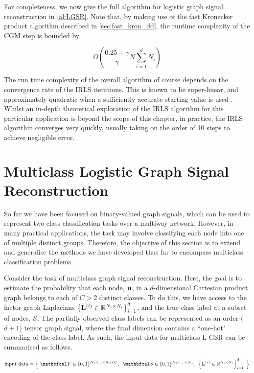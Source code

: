 For completeness, we now give the full algorithm for logistic graph signal reconstruction in \cref{al:LGSR}. Note that, by making use of the fast Kronecker product algorithm described in \cref{sec:fast_kron_dd}, the runtime complexity of the CGM step is bounded by 

\begin{equation*}
    O\left(\frac{0.25 + \gamma}{\gamma} N \sum_{i=1}^d N_i \right)
\end{equation*}

The run time complexity of the overall algorithm of course depends on the convergence rate of the IRLS iterations. This is known to be super-linear, and approximately quadratic when a sufficiently accurate starting value is used \citep{Burden2010}. Whilst an in-depth theoretical exploration of the IRLS algorithm for this particular application is beyond the scope of this chapter, in practice, the IRLS algorithm converges very quickly, usually taking on the order of 10 steps to achieve negligible error.

\section{Multiclass Logistic Graph Signal Reconstruction}

\label{sec:multiclass}

So far we have been focused on binary-valued graph signals, which can be used to represent two-class classification tasks over a multiway network. However, in many practical applications, the task may involve classifying each node into one of multiple distinct groups. Therefore, the objective of this section is to extend and generalise the methods we have developed thus far to encompass multiclass classification problems.

Consider the task of multiclass graph signal reconstruction. Here, the goal is to estimate the probability that each node, $\mathbf{n}$, in a $d$-dimensional Cartesian product graph belongs to each of $C>2$ distinct classes. To do this, we have access to the factor graph Laplacians $\left\{\mathbf{L}^{(i)} \in \mathbb{R}^{N_i \times N_i}\right\}_{i=1}^d$, and the true class label at a subset of nodes, $\mathcal{S}$. The partially observed class labels can be represented as an order-($d + 1$) tensor graph signal, where the final dimension contains a ``one-hot" encoding of the class label. As such, the input data for multiclass L-GSR can be summarised as follows. 

\begin{equation*}
    \text{input data} = \Big\{\; \Yt \in \{0, 1\}^{N_1 \times ... \times N_d \times C}, \;\; \St \in \{0, 1\}^{N_1 \times ... \times N_d} , \;\; \left\{\LL^{(i)} \in \R^{N_i \times N_i}\right\}_{i=1}^d\; \Big\}
\end{equation*}

